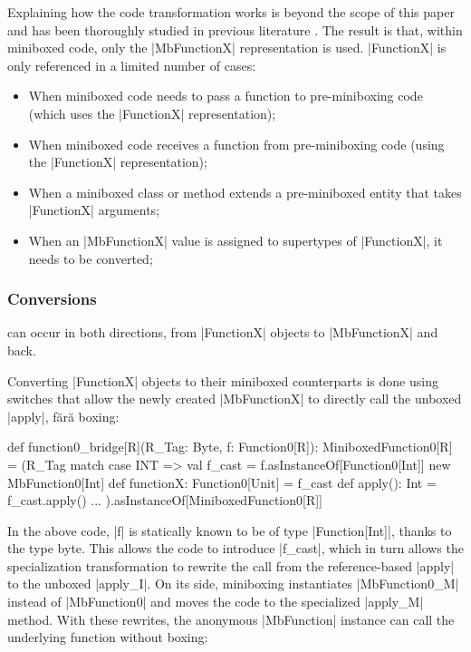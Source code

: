 Explaining how the code transformation works is beyond the scope of this paper and has been thoroughly studied in previous literature \cite{ldl,ildl-tech}. The result is that, within miniboxed code, only the |MbFunctionX| representation is used. |FunctionX| is only referenced in a limited number of cases:
\begin{itemize}
  \item When miniboxed code needs to pass a function to pre-miniboxing code (which uses the |FunctionX| representation);
  \item When miniboxed code receives a function from pre-miniboxing code (using the |FunctionX| representation);
  \item When a miniboxed class or method extends a pre-miniboxed entity that takes |FunctionX| arguments;
  \item When an |MbFunctionX| value is assigned to supertypes of |FunctionX|, it needs to be converted;
\end{itemize}

\subsubsection{Conversions} can occur in both directions, from |FunctionX| objects to |MbFunctionX| and back.

Converting |FunctionX| objects to their miniboxed counterparts is done using switches that allow the newly created |MbFunctionX| to directly call the unboxed |apply|, fără boxing:

\begin{lstlisting-nobreak}
 def function0_bridge[R](R_Tag: Byte, f: Function0[R]): MiniboxedFunction0[R] =
   (R_Tag match {
     case INT =>
       val f_cast = f.asInstanceOf[Function0[Int]]
       new MbFunction0[Int] {
         def functionX: Function0[Unit] = f_cast
         def apply(): Int = f_cast.apply()
       }
     ...
   }).asInstanceOf[MiniboxedFunction0[R]]
\end{lstlisting-nobreak}

In the above code, |f| is statically known to be of type |Function[Int]|, thanks to the type byte. This allows the code to introduce |f_cast|, which in turn allows the specialization transformation to rewrite the call from the reference-based |apply| to the unboxed |apply_I|. On its side, miniboxing instantiates |MbFunction0_M| instead of |MbFunction0| and moves the code to the specialized |apply_M| method. With these rewrites, the anonymous |MbFunction| instance can call the underlying function without boxing:

